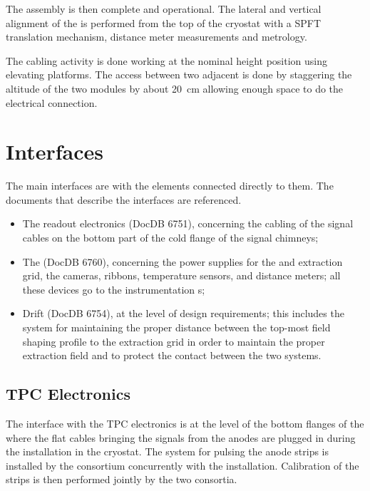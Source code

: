 The assembly is then complete and operational.
The lateral and vertical alignment of the  is performed from the top of the cryostat with a SPFT translation mechanism, distance meter measurements and metrology.

The cabling activity is done  working at the nominal height position using elevating platforms. The access between two adjacent  is done by staggering the altitude of the two modules by about \SI{20}{cm} allowing enough space to do the electrical connection. 
\section{Interfaces}
\label{sec:dp-crp-interfaces}

The main  interfaces  are with the elements connected directly to them. The documents that describe the interfaces are referenced.
\begin{itemize}
\item The readout electronics  (DocDB 6751), concerning the cabling of the signal cables on the bottom part of the cold 
flange of the signal chimneys; 
\item The  (DocDB 6760),  concerning the power supplies for the  and extraction grid, the cameras,  ribbons, temperature sensors, and distance meters; all these devices go to the  instrumentation \fdth{}s; 

\item Drift  (DocDB 6754), at the level of design requirements; this includes the system for maintaining the proper distance between the top-most field shaping profile to the extraction grid in order to maintain the proper extraction field and to protect the contact between the two systems.
\end{itemize}

\subsection{TPC Electronics}
\label{sec:dp-crp-intfc-elec}

The interface with the \dual TPC electronics is at the level of the bottom flanges of the  where the flat cables bringing the signals from the anodes are plugged in during the  installation in the cryostat. The system for %
pulsing the anode strips is installed by the  consortium 
concurrently with the  installation. 
Calibration of the strips is then performed jointly by the two consortia.

